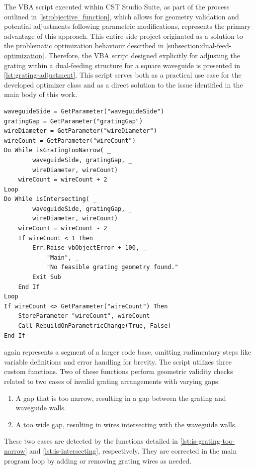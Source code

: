 \documentclass[11pt,a4paper,twoside,openany]{report}
\begin{document}
The VBA script executed within CST Studio Suite, as part of the process outlined in \cref{lst:objective_function}, which allows for geometry validation and potential adjustments following parametric modifications, represents the primary advantage of this approach. This entire side project originated as a solution to the problematic optimization behaviour described in \cref{subsection:dual-feed-optimization}. Therefore, the VBA script designed explicitly for adjusting the grating within a dual-feeding structure for a square waveguide is presented in \cref{lst:grating-adjustment}. This script serves both as a practical use case for the developed optimizer class and as a direct solution to the issue identified in the main body of this work.

\begin{lstlisting}[caption={Grating adjustment script}, label={lst:grating-adjustment}, language=VBScript]
waveguideSide = GetParameter("waveguideSide")
gratingGap = GetParameter("gratingGap")
wireDiameter = GetParameter("wireDiameter")
wireCount = GetParameter("wireCount")
Do While isGratingTooNarrow( _
        waveguideSide, gratingGap, _
        wireDiameter, wireCount)
    wireCount = wireCount + 2
Loop
Do While isIntersecting( _
        waveguideSide, gratingGap, _
        wireDiameter, wireCount)
    wireCount = wireCount - 2
    If wireCount < 1 Then
        Err.Raise vbObjectError + 100, _
            "Main", _
            "No feasible grating geometry found."
        Exit Sub
    End If
Loop
If wireCount <> GetParameter("wireCount") Then
    StoreParameter "wireCount", wireCount
    Call RebuildOnParametricChange(True, False)
End If
\end{lstlisting}

 again represents a segment of a larger code base, omitting rudimentary steps like variable definitions and error handling for brevity. The script utilizes three custom functions. Two of these functions perform geometric validity checks related to two cases of invalid grating arrangements with varying gaps:
\begin{enumerate}[label=(\alph*)]
    \item A gap that is too narrow, resulting in a gap between the grating and waveguide walls.
    \item  A too wide gap, resulting in wires intersecting with the waveguide walls.
\end{enumerate}
These two cases are detected by the functions detailed in \cref{lst:is-grating-too-narrow} and \cref{lst:is-intersecting}, respectively. They are corrected in the main program loop by adding or removing grating wires as needed.
\end{document}
